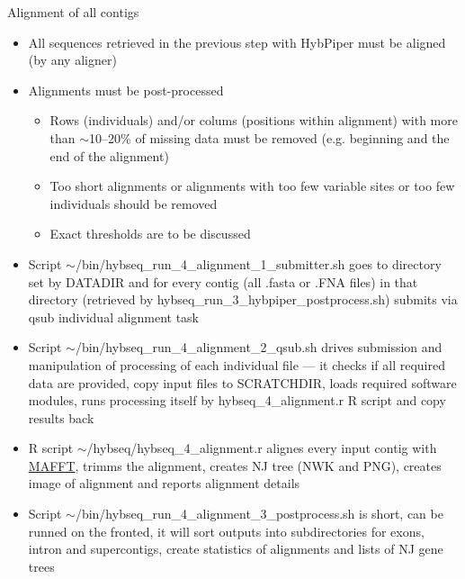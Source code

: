 \documentclass[compress, ucs, xelatex, 11pt, xcolor=x11names, aspectratio=1609,
	hyperref={
		bookmarks=true,
		unicode=true,
		colorlinks=true,
		pdftitle={HybSeq course},
		plainpages=false,
		pdfauthor={Vojtech Zeisek},
		pdfsubject={Practical processing of HybSeq target enrichment sequencing data on computing grids like MetaCentrum},
		pdfcreator={XeLaTeX},
		pdfkeywords={BASH, command line, GNU, HybSeq, Linux, MetaCentrum, sequencing shell, target enrichment},
		linkcolor=Cyan2, %
		anchorcolor=Firebrick2, %
		citecolor=Firebrick2, %
		filecolor=Firebrick2, %
		menucolor=Firebrick2, %
		urlcolor=Chartreuse2, %
		pdftex},
	url={hyphens, lowtilde} %
	]{beamer}
\renewcommand{\texttt}[1]{\colorbox{Snow4}{{\ttfamily #1}}}
\begin{document}
\begin{frame}[allowframebreaks]{Alignment of all contigs}
	\begin{itemize}
		\item All sequences retrieved in the previous step with HybPiper must be aligned (by any aligner)
		\item Alignments must be post-processed
		\begin{itemize}
			\item Rows (individuals) and/or colums (positions within alignment) with more than $\sim$10--20\% of missing data must be removed (e.g. beginning and the end of the alignment)
			\item Too short alignments or alignments with too few variable sites or too few individuals should be removed
			\item Exact thresholds are to be discussed
		\end{itemize}
		\item Script \texttt{$\sim$/bin/hybseq\_run\_4\_alignment\_1\_submitter.sh} goes to directory set by \texttt{DATADIR} and for every contig (all \texttt{*.fasta} or \texttt{*.FNA} files) in that directory (retrieved by \texttt{hybseq\_run\_3\_hybpiper\_postprocess.sh}) submits via \texttt{qsub} individual alignment task
		\item Script \texttt{$\sim$/bin/hybseq\_run\_4\_alignment\_2\_qsub.sh} drives submission and manipulation of processing of each individual file --- it checks if all required data are provided, copy input files to \texttt{SCRATCHDIR}, loads required software modules, runs processing itself by \texttt{hybseq\_4\_alignment.r} \texttt{R} script and copy results back
		\item \texttt{R} script \texttt{$\sim$/hybseq/hybseq\_4\_alignment.r} alignes every input contig with \href{https://mafft.cbrc.jp/alignment/software/}{MAFFT}, trimms the alignment, creates NJ tree (NWK and PNG), creates image of alignment and reports alignment details
		\item Script \texttt{$\sim$/bin/hybseq\_run\_4\_alignment\_3\_postprocess.sh} is short, can be runned on the fronted, it will sort outputs into subdirectories for exons, intron and supercontigs, create statistics of alignments and lists of NJ gene trees
	\end{itemize}
\end{frame}
\end{document}
